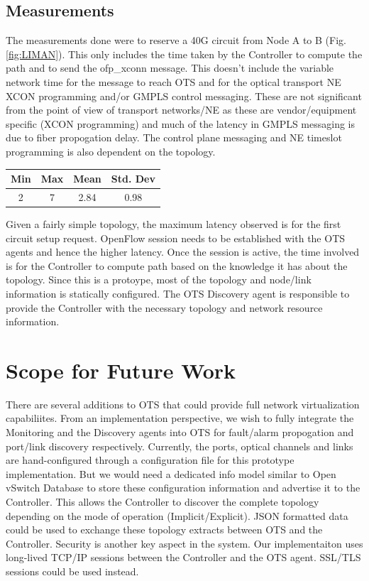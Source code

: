 \documentclass{sig-alternate-10pt}
\begin{document}
	\subsection{Measurements}
	\label{sec:measure}
	The measurements done were to reserve a 40G circuit from Node A to B (Fig. \ref{fig:LIMAN}). This only includes the time 
	taken by the Controller to compute the path and to send the ofp\_xconn message. This doesn't include the variable
	network time for the message to reach OTS and for the optical transport NE XCON programming and/or GMPLS control
	messaging. These are not significant from the point of view of transport networks/NE as these are vendor/equipment
	specific (XCON programming) and much of the latency in GMPLS messaging is due to fiber propogation delay. The control
	plane messaging and NE timeslot programming is also dependent on the topology.

	\begin{center}
		\begin{tabular} { |  c | c | c | c | }
			\hline
			 Min & Max & Mean & Std. Dev \\ \hline
			2	 & 7 & 2.84 & 0.98 \\
			\hline
		\end{tabular}
		\label{tab:measurements}
	\end{center}

	Given a fairly simple topology, the maximum latency observed is for the first circuit setup request. OpenFlow session needs
	to be established with the OTS agents and hence the higher latency. Once the session is active, the time involved is for the
	Controller to compute path based on the knowledge it has about the topology. Since this is a protoype, most of the topology
	and node/link information is statically configured. The OTS Discovery agent is responsible to provide the Controller with the
	necessary topology and network resource information.

\section{Scope for Future Work}
\label{sec:future}
	There are several additions to OTS that could provide full network virtualization capabiliites. From an
	implementation perspective, we wish to fully integrate the Monitoring and the Discovery agents into
	OTS for fault/alarm propogation and port/link discovery respectively. Currently, the ports, optical 
	channels and links are hand-configured through a configuration file for this prototype implementation.
	But we would need a dedicated info model similar to Open vSwitch Database \cite{ovsdb} to store
	these configuration information and advertise it to the Controller. This allows the Controller to discover
	the complete topology depending on the mode of operation (Implicit/Explicit). JSON formatted data 
	could be used to exchange these topology extracts between OTS and the Controller. Security is another
	key aspect in the system. Our implementaiton uses long-lived TCP/IP sessions between the Controller
	and the OTS agent. SSL/TLS sessions could be used instead. \\
\end{document}
